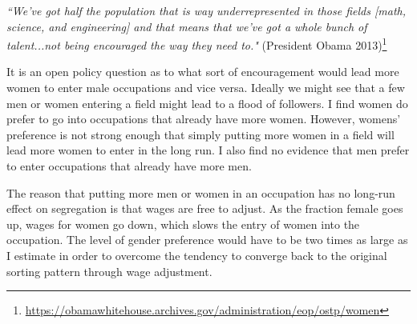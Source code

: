 \documentclass[11pt]{article}
\begin{document}
\textit{``We've got half the population that is way underrepresented in those fields [math, science, and engineering] and that means that we've got a whole bunch of talent...not being encouraged the way they need to."} (President Obama 2013)\footnote{\url{https://obamawhitehouse.archives.gov/administration/eop/ostp/women}}






It is an open policy question as to what sort of encouragement would lead more women to enter male occupations and vice versa. Ideally we might see that a few men or women entering a field might lead to a flood of followers. I find women do prefer to go into occupations that already have more women. However, womens' preference is not strong enough that simply putting more women in a field will lead more women to enter in the long run. I also find no evidence that men prefer to enter occupations that already have more men. 



The reason that putting more men or women in an occupation has no long-run effect on segregation is that wages are free to adjust. As the fraction female goes up, wages for women go down, which slows the entry of women into the occupation. The level of gender preference would have to be two times as large as I estimate in order to overcome the tendency to converge back to the original sorting pattern through wage adjustment.
\end{document}
